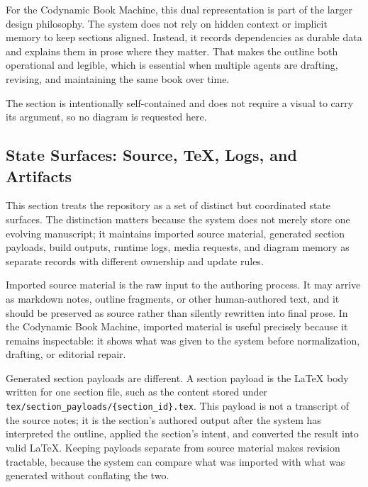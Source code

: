 \documentclass[11pt]{article}
\begin{document}
For the Codynamic Book Machine, this dual representation is part of the larger design philosophy. The system does not rely on hidden context or implicit memory to keep sections aligned. Instead, it records dependencies as durable data and explains them in prose where they matter. That makes the outline both operational and legible, which is essential when multiple agents are drafting, revising, and maintaining the same book over time.

The section is intentionally self-contained and does not require a visual to carry its argument, so no diagram is requested here.



\subsection{State Surfaces: Source, TeX, Logs, and Artifacts}


This section treats the repository as a set of distinct but coordinated state surfaces. The distinction matters because the system does not merely store one evolving manuscript; it maintains imported source material, generated section payloads, build outputs, runtime logs, media requests, and diagram memory as separate records with different ownership and update rules.

Imported source material is the raw input to the authoring process. It may arrive as markdown notes, outline fragments, or other human-authored text, and it should be preserved as source rather than silently rewritten into final prose. In the Codynamic Book Machine, imported material is useful precisely because it remains inspectable: it shows what was given to the system before normalization, drafting, or editorial repair.

Generated section payloads are different. A section payload is the \LaTeX{} body written for one section file, such as the content stored under \texttt{tex/section\_payloads/\{section\_id\}.tex}. This payload is not a transcript of the source notes; it is the section's authored output after the system has interpreted the outline, applied the section's intent, and converted the result into valid \LaTeX{}. Keeping payloads separate from source material makes revision tractable, because the system can compare what was imported with what was generated without conflating the two.
\end{document}
